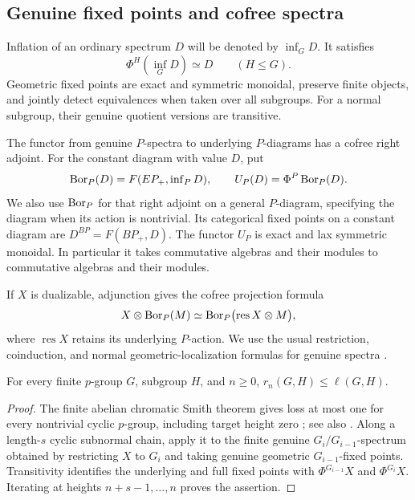 \subsection{Genuine fixed points and cofree spectra}

Inflation of an ordinary spectrum \(D\) will be denoted by \(\operatorname{inf}_G D\). It satisfies
\[
 \Phi^H(\operatorname{inf}_G D)\simeq D
 \qquad(H\le G).
\]
Geometric fixed points are exact and symmetric monoidal, preserve finite objects, and jointly detect equivalences when taken over all subgroups. For a normal subgroup, their genuine quotient versions are transitive.

The functor from genuine \(P\)-spectra to underlying \(P\)-diagrams has a cofree right adjoint. For the constant diagram with value \(D\), put
\[
 \operatorname{Bor}_P(D)=F(EP_+,\operatorname{inf}_P D),
 \qquad U_P(D)=\Phi^P\operatorname{Bor}_P(D).
\]
We also use \(\operatorname{Bor}_P\) for that right adjoint on a general \(P\)-diagram, specifying the diagram when its action is nontrivial. Its categorical fixed points on a constant diagram are \(D^{BP}=F(BP_+,D)\). The functor \(U_P\) is exact and lax symmetric monoidal. In particular it takes commutative algebras and their modules to commutative algebras and their modules.

If \(X\) is dualizable, adjunction gives the cofree projection formula
\begin{equation}\label{eq:cofree-projection}
 X\otimes\operatorname{Bor}_P(M)\simeq
 \operatorname{Bor}_P\bigl(\operatorname{res}X\otimes M\bigr),
\end{equation}
where \(\operatorname{res}X\) retains its underlying \(P\)-action. We use the usual restriction, coinduction, and normal geometric-localization formulas for genuine spectra \cite[Section~2]{BS}.

\begin{proposition}\label{prop:cyclic-upper}
For every finite \(p\)-group \(G\), subgroup \(H\), and \(n\ge0\),
\(r_n(G,H)\le\ell(G,H)\).
\end{proposition}
\begin{proof}
The finite abelian chromatic Smith theorem gives loss at most one for every nontrivial cyclic \(p\)-group, including target height zero \cite[Theorem~2.1 and Corollary~3.12]{BHNNNS}; see also \cite[Theorem~5.1]{KL}. Along a length-\(s\) cyclic subnormal chain, apply it to the finite genuine \(G_i/G_{i-1}\)-spectrum obtained by restricting \(X\) to \(G_i\) and taking genuine geometric \(G_{i-1}\)-fixed points. Transitivity identifies the underlying and full fixed points with \(\Phi^{G_{i-1}}X\) and \(\Phi^{G_i}X\). Iterating at heights \(n+s-1,\ldots,n\) proves the assertion.
\end{proof}

